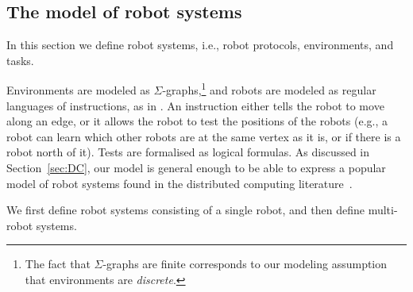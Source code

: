 \documentclass{aamas2015}
\def\pn{\mathbf{ports}}
\def\deg{\textsf{deg}}
\begin{document}
\subsection{The model of robot systems}

In this section we define robot systems, i.e., robot protocols, environments, and tasks. 

Environments are modeled as $\Sigma$-graphs,\footnote{The fact that $\Sigma$-graphs are finite corresponds to our modeling assumption that environments are {\em discrete}.} 
 and robots are modeled as regular languages of instructions, as in \cite{BlEn97}.
An instruction either tells the robot to move along an edge, or it allows the robot to test the positions of the robots (e.g., a robot can learn which other robots are at the same vertex as it is, or if there is a robot north of it). Tests are formalised as logical formulas. As discussed in Section~\ref{sec:DC}, our model is general enough to be able to express a popular model of robot systems found in the distributed computing literature~\cite{FIPPP04,Diks200438,Cohen05graphexploration,KKR06,GR08,Das13}.
 
We first define robot systems consisting of a single robot, and then define multi-robot systems.





\end{document}
